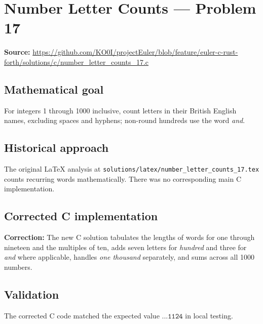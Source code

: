 \section{Number Letter Counts --- Problem 17}
\label{prob:17}
\noindent\textbf{Source:} \url{https://github.com/KO0I/projectEuler/blob/feature/euler-c-rust-forth/solutions/c/number_letter_counts_17.c}
\subsection*{Mathematical goal}
For integers 1 through 1000 inclusive, count letters in their British English names, excluding spaces and hyphens; non-round hundreds use the word \emph{and}.
\subsection*{Historical approach}
The original \LaTeX{} analysis at \texttt{solutions/latex/number\_letter\_counts\_17.tex} counts recurring words mathematically. There was no corresponding main C implementation.
\subsection*{Corrected C implementation}
{\color{red}\textbf{Correction:} The new C solution tabulates the lengths of words for one through nineteen and the multiples of ten, adds seven letters for \emph{hundred} and three for \emph{and} where applicable, handles \emph{one thousand} separately, and sums across all 1000 numbers.}
\subsection*{Validation}
The corrected C code matched the expected value \(\texttt{...1124}\) in local testing.

